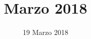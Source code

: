 


\title{ Marzo 2018}
\author{\GroupName}

\date{19 Marzo 2018}



\frenchspacing

\makeFrontPage



